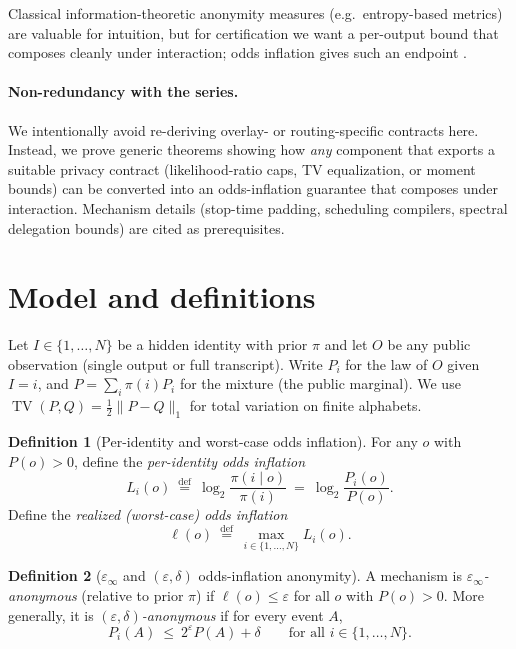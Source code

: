 \documentclass[11pt]{article}
\DeclareMathOperator{\TV}{TV}
\newcommand{\defeq}{\stackrel{\mathrm{def}}{=}}
\theoremstyle{definition}
\newtheorem{definition}{Definition}
\theoremstyle{remark}
\begin{document}
Classical information-theoretic anonymity measures (e.g.\ entropy-based metrics) are valuable for intuition, but for certification we want a per-output bound that composes cleanly under interaction; odds inflation gives such an endpoint \cite{SerjantovDanezis2002}.

\paragraph{Non-redundancy with the series.}
We intentionally avoid re-deriving overlay- or routing-specific contracts here.
Instead, we prove generic theorems showing how \emph{any} component that exports a suitable privacy contract (likelihood-ratio caps, TV equalization, or moment bounds) can be converted into an odds-inflation guarantee that composes under interaction.
Mechanism details (stop-time padding, scheduling compilers, spectral delegation bounds) are cited as prerequisites.

\section{Model and definitions}
Let $I\in\{1,\dots,N\}$ be a hidden identity with prior $\pi$ and let $O$ be any public observation (single output or full transcript).
Write $P_i$ for the law of $O$ given $I=i$, and $P=\sum_i \pi(i)P_i$ for the mixture (the public marginal).
We use $\TV(P,Q)=\tfrac12\|P-Q\|_1$ for total variation on finite alphabets.

\begin{definition}[Per-identity and worst-case odds inflation]\label{def:odds_inflation}
For any $o$ with $P(o)>0$, define the \emph{per-identity odds inflation}
\[
L_i(o)\ \defeq\ \log_2\frac{\pi(i\mid o)}{\pi(i)}\ =\ \log_2\frac{P_i(o)}{P(o)}.
\]
Define the \emph{realized (worst-case) odds inflation}
\[
\ell(o)\ \defeq\ \max_{i\in\{1,\dots,N\}} L_i(o).
\]
\end{definition}

\begin{definition}[$\varepsilon_\infty$ and $(\varepsilon,\delta)$ odds-inflation anonymity]\label{def:epsinf}
A mechanism is \emph{$\varepsilon_\infty$-anonymous} (relative to prior $\pi$) if $\ell(o)\le \varepsilon$ for all $o$ with $P(o)>0$.
More generally, it is \emph{$(\varepsilon,\delta)$-anonymous} if for every event $A$,
\begin{equation}\label{eq:hockeystick}
P_i(A)\ \le\ 2^\varepsilon P(A) + \delta
\qquad\text{for all } i\in\{1,\dots,N\}.
\end{equation}
\end{definition}
\end{document}
